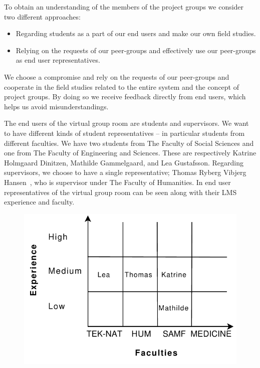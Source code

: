 To obtain an understanding of the members of the project groups we consider two different approaches:  
\begin{itemize}
\item Regarding students as a part of our end users and make our own field studies.
\item Relying on the requests of our peer-groups and effectively use our peer-groups as end user representatives.
\end{itemize}
We choose a compromise and rely on the requests of our peer-groups and cooperate in the field studies related to the entire system and the concept of project groups.
By doing so we receive feedback directly from end users, which helps us avoid misunderstandings.


The end users of the virtual group room are students and supervisors.
We want to have different kinds of student representatives -- in particular students from different faculties.
We have two students from The Faculty of Social Sciences and one from The Faculty of Engineering and Sciences.
These are respectively Katrine Holmgaard Dinitzen, Mathilde Gammelgaard, and Lea Gustafsson.
Regarding supervisors, we choose to have a single representative; Thomas Ryberg Vibjerg Hansen~\cite{thomas}, who is supervisor under The Faculty of Humanities.
In  end user representatives of the virtual group room can be seen along with their LMS experience and faculty.

\begin{figure}%
\center
\includegraphics[scale=0.50]{images/MembersofpROJECTgROUJP}%
%
\label{fig:memPG}%
\end{figure}

